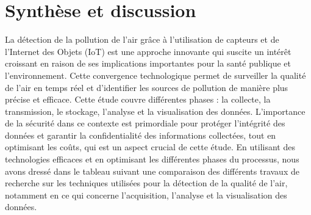 \documentclass{report}
\begin{document}
\section{Synthèse et discussion}
La détection de la pollution de l'air grâce à l'utilisation de capteurs et de l'Internet des Objets (IoT) est une approche innovante qui suscite un intérêt croissant en raison de ses implications importantes pour la santé publique et l'environnement. Cette convergence technologique permet de surveiller la qualité de l'air en temps réel et d'identifier les sources de pollution de manière plus précise et efficace.
Cette étude couvre différentes phases : la collecte, la transmission, le stockage, l'analyse et la visualisation des données. L'importance de la sécurité dans ce contexte est primordiale pour protéger l'intégrité des données et garantir la confidentialité des informations collectées, tout en optimisant les coûts, qui est un aspect crucial de cette étude.
En utilisant des technologies efficaces et en optimisant les différentes phases du processus, nous avons dressé dans le tableau suivant une comparaison des différents travaux de recherche sur les techniques utilisées pour la détection de la qualité de l'air, notamment en ce qui concerne l'acquisition, l'analyse et la visualisation des données. 
\end{document}
